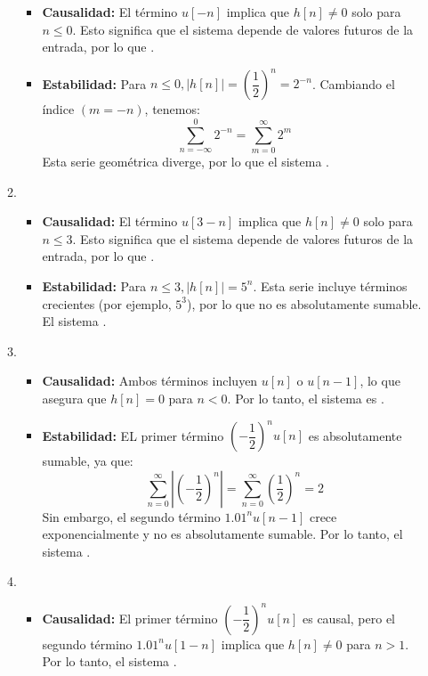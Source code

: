 \begin{enumerate}[label=\color{red}\textbf{\arabic*)}]
\begin{enumerate}[label=\color{red}\textbf{\alph*)}]
      \begin{itemize}[label=\textbullet]
        \item \textbf{Causalidad:} El término $u[-n]$ implica que $h[n]\neq 0$ solo para $n\le 0$. Esto significa que el sistema depende de valores futuros de la entrada, por lo que .
        \item \textbf{Estabilidad:} Para $n\le 0,|h[n]|=\left( \dfrac{1}{2} \right) ^n=2^{-n}$. Cambiando el índice $(m=-n)$, tenemos:  \[
        \sum_{n=-\infty}^{0} 2^{-n}=\sum_{m=0}^{\infty} 2^m
        \] 
        Esta serie geométrica diverge, por lo que el sistema . 
      \end{itemize}
    \item {} 
      \begin{itemize}[label=\textbullet]
        \item \textbf{Causalidad:} El término $u[3-n]$  implica que $h[n]\neq 0$ solo para $n\le 3$. Esto significa que el sistema depende de valores futuros de la entrada, por lo que .
        \item \textbf{Estabilidad:} Para $n\le 3,|h[n]|=5^n$. Esta serie incluye términos crecientes (por ejemplo, $5^3$), por lo que no es absolutamente sumable. El sistema . 
      \end{itemize}
    \item {} 
      \begin{itemize}[label=\textbullet]
        \item \textbf{Causalidad:} Ambos términos incluyen $u[n]$ o  $u[n-1]$, lo que asegura que $h[n]=0$ para $n<0$. Por lo tanto, el sistema es  . 
        \item \textbf{Estabilidad:} EL primer término $\left( -\dfrac{1}{2} \right) ^{n}u[n]$ es absolutamente sumable, ya que: \[
        \sum_{n=0}^{\infty} \left| \left( -\dfrac{1}{2} \right) ^{n} \right| =\sum_{n=0}^{\infty} \left( \dfrac{1}{2} \right) ^n=2
        \] 
        Sin embargo, el segundo término $1.01^nu[n-1]$ crece exponencialmente y no es absolutamente sumable. Por lo tanto, el sistema  .
      \end{itemize}
    \item {} 
      \begin{itemize}[label=\textbullet]
        \item \textbf{Causalidad:} El primer término $\left( -\dfrac{1}{2} \right) ^nu[n]$ es causal, pero el segundo término $1.01^nu[1-n]$ implica que  $h[n]\neq 0$ para  $n>1$. Por lo tanto, el sistema  .

\end{itemize}
\end{enumerate}
\end{enumerate}
